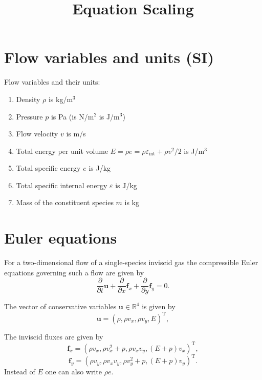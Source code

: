 \documentclass[a4paper,11pt,english]{article}
\title{Equation Scaling}
\begin{document}
\section{Flow variables and units (SI)}

Flow variables and their units:
\begin{enumerate}
    \item Density $\rho$ is kg/m$^3$
    \item Pressure $p$ is Pa (is N/m$^2$ is J/m$^3$)
    \item Flow velocity $v$ is m/s
    \item Total energy per unit volume $E=\rho e=\rho \varepsilon_{\mathrm{int}} + \rho v^2 / 2$ is J/m$^3$
    \item Total specific energy $e$ is J/kg
    \item Total specific internal energy $\varepsilon$ is J/kg
    \item Mass of the constituent species $m$ is kg
\end{enumerate}

\section{Euler equations}
For a two-dimensional flow of a single-species inviscid gas the compressible Euler equations governing such a flow are given by
\begin{equation}
    \frac{\partial}{\partial t}\mathbf{u} + \frac{\partial}{\partial x}\mathbf{f}_x + \frac{\partial}{\partial y}\mathbf{f}_y = 0.
\end{equation}

The vector of conservative variables  $\mathbf{u} \in \mathbb{R}^4$ is given by
\begin{equation}
     \mathbf{u} = \left(\rho, \rho v_x, \rho v_y, E \right)^{\mathrm{T}},
\end{equation}

The inviscid fluxes are given by
\begin{equation}
     \mathbf{f}_x = \left(\rho v_x, \rho v_x^2 + p, \rho v_x v_y, (E+p)v_x \right)^{\mathrm{T}},
\end{equation}
\begin{equation}
     \mathbf{f}_y = \left(\rho v_y, \rho v_x v_y, \rho v_y^2 + p, (E+p)v_y \right)^{\mathrm{T}}.
\end{equation}
Instead of $E$ one can also write $\rho e$.
\end{document}
